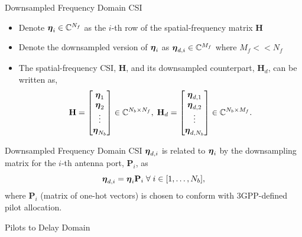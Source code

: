 \documentclass{beamer}
\begin{document}
  \begin{frame}{Downsampled Frequency Domain CSI}
    \begin{itemize}
      \item Denote $\boldsymbol{\eta}_i \in \mathbb{C}^{N_f}$ as the $i$-th row of the spatial-frequency matrix $\mathbf{H}$
      \item Denote the downsampled version of $\boldsymbol{\eta}_i$ as $\boldsymbol{\eta}_{d,i} \in \mathbb{C}^{M_f}$ where $M_f << N_f$
      \item The spatial-frequency CSI, $\mathbf{H}$, and its downsampled counterpart, $\mathbf{H}_d$, can be written as,
      \begin{equation}
        \mathbf{H} = \begin{bmatrix} \boldsymbol{\eta}_1 \\ \boldsymbol{\eta}_2 \\ \vdots \\ \boldsymbol{\eta}_{N_b} \\\end{bmatrix}\in\mathbb{C}^{N_b \times N_f}, \; \mathbf{H}_d = \begin{bmatrix} \boldsymbol{\eta}_{d,1} \\ \boldsymbol{\eta}_{d,2} \\ \vdots \\ \boldsymbol{\eta}_{d,N_b} \\\end{bmatrix}\in\mathbb{C}^{N_b \times M_f}.
      \end{equation}
    \end{itemize}
  \end{frame}

  \begin{frame}{Downsampled Frequency Domain CSI}
    $\boldsymbol{\eta}_{d,i}$ is related to $\boldsymbol{\eta}_i$ by the downsampling matrix for the $i$-th antenna port, $\mathbf{P}_i$, as
    \begin{equation}
      \boldsymbol{\eta}_{d,i} = \boldsymbol{\eta}_i \mathbf{P}_i \; \forall \; i \in [1, \dots, N_b],
    \end{equation}
    where $\mathbf{P}_i$ (matrix of one-hot vectors) is chosen to conform with 3GPP-defined pilot allocation.
  \end{frame}

  \begin{frame}{Pilots to Delay Domain}
    \begin{figure}[!hbtp]
    \centering
    {
      \fontsize{6pt}{6pt}
      \def\svgwidth{0.8\columnwidth}
      
    }
    \label{fig:pilot_downsampling}
    \end{figure}
  \end{frame}
\end{document}
